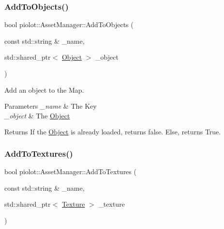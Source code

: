 \subsubsection{\texorpdfstring{Add\+To\+Objects()}{AddToObjects()}}
{\footnotesize\ttfamily bool piolot\+::\+Asset\+Manager\+::\+Add\+To\+Objects (\begin{DoxyParamCaption}\item[{const std\+::string \&}]{\+\_\+name,  }\item[{std\+::shared\+\_\+ptr$<$ \mbox{\hyperlink{classpiolot_1_1_object}{Object}} $>$}]{\+\_\+object }\end{DoxyParamCaption})\hspace{0.3cm}{\ttfamily [inline]}}



Add an object to the Map. 


\begin{DoxyParams}{Parameters}
{\em \+\_\+name} & The Key \\
\hline
{\em \+\_\+object} & The \mbox{\hyperlink{classpiolot_1_1_object}{Object}} \\
\hline
\end{DoxyParams}
\begin{DoxyReturn}{Returns}
If the \mbox{\hyperlink{classpiolot_1_1_object}{Object}} is already loaded, returns false. Else, returns True. 
\end{DoxyReturn}
\mbox{\label{classpiolot_1_1_asset_manager_a06b647312e18c2ca212d34211d262783}} 
\subsubsection{\texorpdfstring{Add\+To\+Textures()}{AddToTextures()}}
{\footnotesize\ttfamily bool piolot\+::\+Asset\+Manager\+::\+Add\+To\+Textures (\begin{DoxyParamCaption}\item[{const std\+::string \&}]{\+\_\+name,  }\item[{std\+::shared\+\_\+ptr$<$ \mbox{\hyperlink{classpiolot_1_1_texture}{Texture}} $>$}]{\+\_\+texture }\end{DoxyParamCaption})\hspace{0.3cm}{\ttfamily [inline]}}



